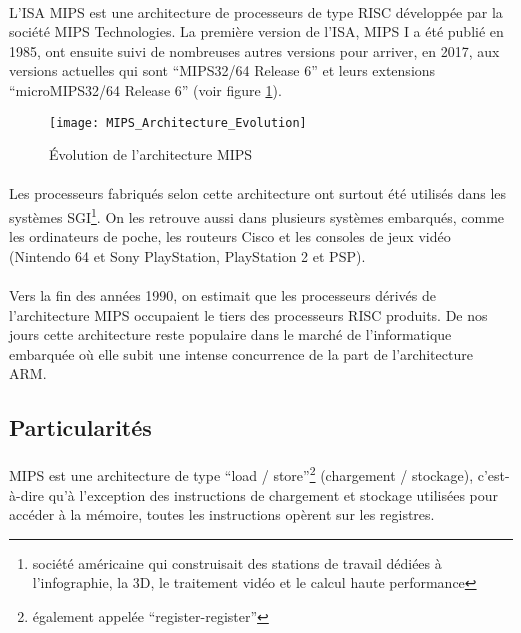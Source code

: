 \documentclass[11pt, book, english, french, standardlists]{upmethodology-document}
\begin{document}
				\paragraph*{}
					L'\gls{ISA} \gls{MIPS} est une architecture de processeurs de type \gls{RISC} développée par la société MIPS Technologies. La première version de l'\gls{ISA}, \gls{MIPS} I a été publié en 1985, ont ensuite suivi de nombreuses autres versions pour arriver, en 2017, aux versions actuelles qui sont ``MIPS32/64 Release 6'' et leurs extensions ``microMIPS32/64 Release 6'' (voir figure \ref{fig:MIPS_Architecture_Evolution}).
					\begin{figure}[H]
						\centering
						\texttt{[image: MIPS\_Architecture\_Evolution]}
						\caption{Évolution de l'architecture \acrshort{MIPS}\cite{MIPS32Arch}}
						\label{fig:MIPS_Architecture_Evolution}
					\end{figure}
				\paragraph*{}
					Les processeurs fabriqués selon cette architecture ont surtout été utilisés dans les systèmes SGI\footnote{société américaine qui construisait des stations de travail dédiées à l'infographie, la 3D, le traitement vidéo et le calcul haute performance}. On les retrouve aussi dans plusieurs systèmes embarqués, comme les ordinateurs de poche, les routeurs Cisco et les consoles de jeux vidéo (Nintendo 64 et Sony PlayStation, PlayStation 2 et PSP).
				\paragraph*{}
					Vers la fin des années 1990, on estimait que les processeurs dérivés de l'architecture \gls{MIPS} occupaient le tiers des processeurs \gls{RISC} produits. De nos jours cette architecture reste populaire dans le marché de l'informatique embarquée où elle subit une intense concurrence de la part de l'architecture ARM.
			\subsection{Particularités}
				\paragraph*{}
					\gls{MIPS} est une architecture de type ``load / store''\footnote{également appelée ``register-register''} (chargement / stockage), c'est-à-dire qu'à l'exception des instructions de chargement et stockage utilisées pour accéder à la mémoire, toutes les instructions opèrent sur les registres.
\end{document}
